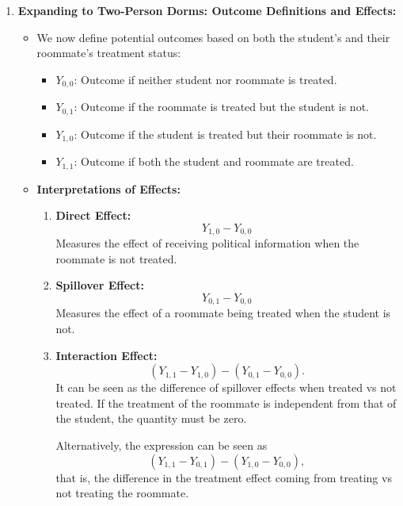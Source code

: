\documentclass[12pt]{article}
\begin{document}
\begin{enumerate}
\begin{enumerate}[label=(\alph*)]
    \item \textbf{Expanding to Two-Person Dorms: Outcome Definitions and Effects:}
    \begin{itemize}
        \item We now define potential outcomes based on both the student's and their roommate's treatment status:
        \begin{itemize}
            \item \( Y_{0,0} \): Outcome if neither student nor roommate is treated.
            \item \( Y_{0,1} \): Outcome if the roommate is treated but the student is not.
            \item \( Y_{1,0} \): Outcome if the student is treated but their roommate is not.
            \item \( Y_{1,1} \): Outcome if both the student and roommate are treated.
        \end{itemize}
        \item \textbf{Interpretations of Effects:}
        \begin{enumerate}[label=(\roman*)]
            \item \textbf{Direct Effect:}
            \[
            Y_{1,0} - Y_{0,0}
            \]
            Measures the effect of receiving political information when the roommate is not treated.
            
            \item \textbf{Spillover Effect:}
            \[
            Y_{0,1} - Y_{0,0}
            \]
            Measures the effect of a roommate being treated when the student is not.
            
            \item \textbf{Interaction Effect:}
            \[
            (Y_{1,1} - Y_{1,0}) - (Y_{0,1} - Y_{0,0}).
            \]
            It can be seen as the difference of spillover effects when treated vs not treated. If the treatment of the roommate is independent from that of the student, the quantity must be zero. 
            
            Alternatively, the expression can be seen as
            \[
            (Y_{1,1} - Y_{0,1}) - (Y_{1,0} - Y_{0,0}),
            \]
            that is, the difference in the treatment effect coming from treating vs not treating the roommate.
        \end{enumerate}
    \end{itemize}
\end{enumerate}


\end{enumerate}
\end{document}
